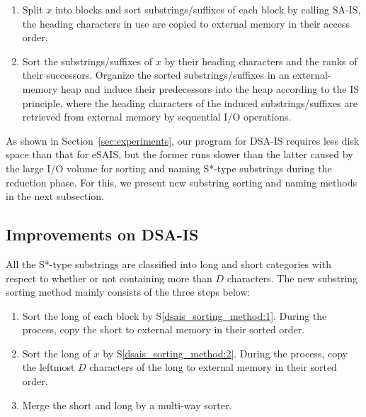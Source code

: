 \documentclass[10pt,journal,compsoc]{IEEEtran}
\begin{document}
\begin{enumerate}[S1]
	\item Split $x$ into blocks and sort substrings/suffixes of each block by calling SA-IS, the heading characters in use are copied to external memory in their access order. \label{dsais_sorting_method:1}
	\item Sort the substrings/suffixes of $x$ by their heading characters and the ranks of their successors. Organize the sorted substrings/suffixes in an external-memory heap and induce their predecessors into the heap according to the IS principle, where the heading characters of the induced substrings/suffixes are retrieved from external memory by sequential I/O operations.\label{dsais_sorting_method:2}
\end{enumerate} 

As shown in Section~\ref{sec:experiments}, our program for DSA-IS requires less disk space than that for eSAIS, but the former runs slower than the latter caused by the large I/O volume for sorting and naming S*-type substrings during the reduction phase. For this, we present new substring sorting and naming methods in the next subsection.

\subsection{Improvements on DSA-IS}

All the S*-type substrings are classified into long and short categories with respect to whether or not containing more than $D$ characters. The new substring sorting method mainly consists of the three steps below:

\begin{enumerate}[S1']
	\item Sort the long of each block by S\ref{dsais_sorting_method:1}. During the process, copy the short to external memory in their sorted order.~\label{dsaism_sorting_method:1}
	
	\item Sort the long of $x$ by S\ref{dsais_sorting_method:2}. During the process, copy the leftmost $D$ characters of the long to external memory in their sorted order.~\label{dsaism_sorting_method:2}
	
	\item Merge the short and long by a multi-way sorter.~\label{dsaism_sorting_method:3}
\end{enumerate}
\end{document}
